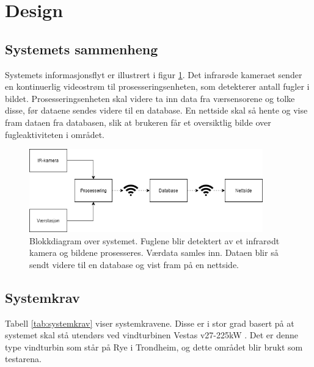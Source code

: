 \section{Design}\label{sec:design}
\subsection{Systemets sammenheng}\label{sec:design:sammenheng}

Systemets informasjonsflyt er illustrert i figur \ref{fig:blokkDig}. 
Det infrarøde kameraet sender en kontinuerlig videostrøm til prosesseringsenheten, som detekterer antall fugler i bildet. 
Prosesseringsenheten skal videre ta inn data fra værsensorene og tolke disse, før dataene sendes videre til en database. 
En nettside skal så hente og vise fram dataen fra databasen, slik at brukeren får et oversiktlig bilde over fugleaktiviteten i området. 

\begin{figure}[H]
    \centering
    \includegraphics[width=0.9\textwidth]{design/designflytskjema.png}
    \caption{Blokkdiagram over systemet. Fuglene blir detektert av et infrarødt kamera og bildene prosesseres. Værdata samles inn. Dataen blir så sendt videre til en database og vist fram på en nettside.}
    \label{fig:blokkDig}
\end{figure}

\newpage
\subsection{Systemkrav}\label{sec:design:systemkrav}
Tabell \ref{tab:systemkrav} viser systemkravene. 
Disse er i stor grad basert på at systemet skal stå utendørs ved vindturbinen Vestas v27-225kW \cite{vindturbin}.
Det er denne type vindturbin som står på Rye i Trondheim, og dette området blir brukt som testarena. 




